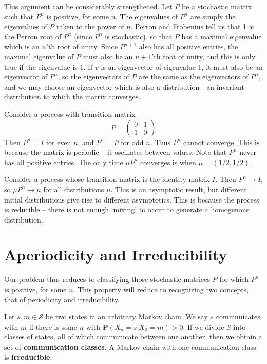 This argument can be considerably strengthened. Let $P$ be a stochastic matrix such that $P^n$ is positive, for some $n$. The eigenvalues of $P^n$ are simply the eigenvalues of $P$ taken to the power of $n$. Perron and Frobenius tell us that 1 is the Perron root of $P^n$ (since $P^n$ is stochastic), so that $P$ has a maximal eigenvalue which is an $n$'th root of unity. Since $P^{n+1}$ also has all positive entries, the maximal eigenvalue of $P$ must also be an $n+1$'th root of unity, and this is only true if the eigenvalue is 1. If $v$ is an eigenvector of eigenvalue 1, it must also be an eigenvector of $P^n$, so the eigenvectors of $P$ are the same as the eigenvectors of $P^n$, and we may choose an eigenvector which is also a distribution - an invariant distribution to which the matrix converges.


\begin{example}
    Consider a process with transition matrix
    \[ P = \begin{pmatrix} 0 & 1 \\ 1 & 0 \end{pmatrix} \]
    Then $P^n = I$ for even $n$, and $P^n = P$ for odd $n$. Thus $P^n$ cannot converge. This is because the matrix is periodic -- it oscillates between values. Note that $P^n$ never has all positive entries. The only time $\mu P^n$ converges is when $\mu = (1/2, 1/2)$.
\end{example}

\begin{example}
    Consider a process whose transition matrix is the identity matrix $I$. Then $P^n \to I$, so $\mu P^n \to \mu$ for all distributions $\mu$. This is an asymptotic result, but different initial distributions give rise to different asymptotics. This is because the process is reducible -- there is not enough `mixing' to occur to generate a homogenous distribution.
\end{example}

\section{Aperiodicity and Irreducibility}

Our problem thus reduces to classifying those stochastic matrices $P$ for which $P^n$ is positive, for some $n$. This property will reduce to recognizing two concepts, that of periodicity and irreducibility.

\begin{definition}
    Let $s,m \in \mathcal{S}$ be two states in an arbitrary Markov chain. We say $s$ communicates with $m$ if there is some $n$ with $\mathbf{P}(X_n = s | X_0 = m) > 0$. If we divide $\mathcal{S}$ into classes of states, all of which communicate between one another, then we obtain a set of {\bf communication classes}. A Markov chain with one communication class is {\bf irreducible}.
\end{definition}

